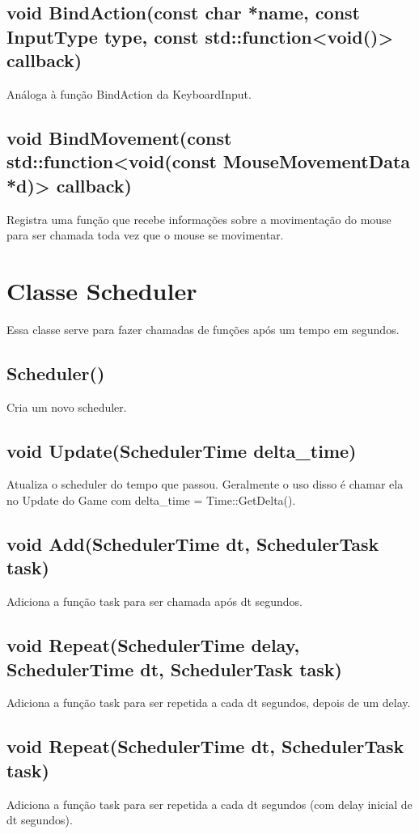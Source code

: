 \subsection{void BindAction(const char *name, const InputType type, const std::function<void()> callback)}
Análoga à função BindAction da KeyboardInput.

\subsection{void BindMovement(const std::function<void(const MouseMovementData *d)> callback)}
Registra uma função que recebe informações sobre a movimentação do mouse para ser chamada toda vez que o mouse se movimentar.

\section{Classe Scheduler}
\label{doc:scheduler}
Essa classe serve para fazer chamadas de funções após um tempo em segundos.

\subsection{Scheduler()}
Cria um novo scheduler.

\subsection{void Update(SchedulerTime delta\_time)}
Atualiza o scheduler do tempo que passou. Geralmente o uso disso é chamar ela no Update do Game com delta\_time = Time::GetDelta().

\subsection{void Add(SchedulerTime dt, SchedulerTask task)}
Adiciona a função task para ser chamada após dt segundos.

\subsection{void Repeat(SchedulerTime delay, SchedulerTime dt, SchedulerTask task)}
Adiciona a função task para ser repetida a cada dt segundos, depois de um delay.

\subsection{void Repeat(SchedulerTime dt, SchedulerTask task)}
Adiciona a função task para ser repetida a cada dt segundos (com delay inicial de dt segundos).


